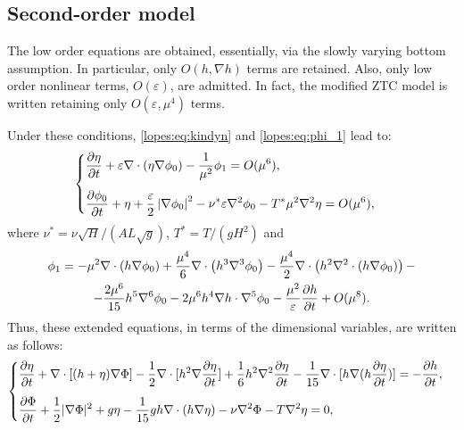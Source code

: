 
\subsection{Second-order model}\label{lopes:subsec:ztc}
The low order equations are obtained, essentially, via
the slowly varying bottom assumption. In
particular, only  \(O(h,\nabla h)\) terms are 
retained.
Also, only low order  nonlinear terms, \(O(\varepsilon)\), are admitted.
In fact, the modified ZTC model is  written retaining
only \(O(\varepsilon,\mu^4)\) terms.
 
Under these conditions,  \eqref{lopes:eq:kindyn}
and \eqref{lopes:eq:phi_1} lead to:
\begin{equation}\label{lopes:eq:kindyn2}
\begin{cases}
\displaystyle\fpar{\eta}{t}+\varepsilon\nabla\cdot(\eta\nabla\phi_0)-\frac{1}{\mu^2}\phi_1=O(\mu^{6}),\vspace{0.3cm} \\
\displaystyle\fpar{\phi_0}{t}+\eta +
\frac{\varepsilon}{2} \left|\nabla\phi_0\right|^2-\nu^*\varepsilon\nabla^2\phi_0-T^*\mu^2\nabla^2\eta
=O(\mu^{6}),
\end{cases}
\end{equation}
where \(\nu^*=\nu\sqrt{H}/(AL\sqrt{g})\), \(T^*= T/(gH^2)\) 
and
\begin{multline}\label{lopes:eq:phi_2}
\phi_1=
-\mu^{2}\nabla\cdot\left(h\nabla\phi_0\right)
+\frac{\mu^{4}}{6}\nabla\cdot\left(h^3\nabla^3\phi_0\right)
-\frac{\mu^{4}}{2}\nabla\cdot\left(h^2
\nabla^2\cdot\left(h\nabla\phi_0\right) \right)-\\
-\frac{2\mu^6}{15}h^5\nabla^6\phi_0-2\mu^6h^4\nabla h\cdot\nabla^5\phi_0
-\frac{\mu^2}{\varepsilon}\frac{\partial h}{\partial t}+O(\mu^{8}).
\end{multline}
Thus, these extended equations, in terms of the dimensional
variables, are written as follows:
\begin{equation}\label{lopes:eq:ztc}
\begin{cases}
\displaystyle \frac{\partial\eta}{\partial t} +\nabla\cdot[(h+\eta)\nabla{\Phi}]
-\frac{1}{2}\nabla\cdot [h^{2}\nabla\frac{\partial \eta}
{\partial t}]
+\frac{1}{6}h^{2}\nabla^2\frac{\partial\eta}{\partial t}
-\frac{1}{15}\nabla\cdot[h\nabla(h\frac{\partial\eta}
{\partial t})]=-\fpar{h}{t},\vspace{0.3cm} \\
\displaystyle \frac{\partial \Phi}{\partial t}
+\frac{1}{2}|\nabla\Phi|^2+g\eta-
\frac{1}{15}gh\nabla\cdot(h\nabla\eta)-\nu\nabla^2\Phi-T\nabla^2\eta=0,
\end{cases}
\end{equation}
